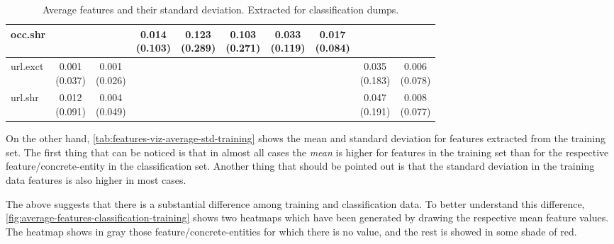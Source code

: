 \documentclass[epsfig,a4paper,11pt,titlepage,twoside,openany]{book}
\begin{document}
\begin{table}[H]
\begin{tabular}{l|c|c|c|c|c|c|c|c|c|}
\multicolumn{1}{|l|}{occ.shr}                  &               &              & \makecell{0.014 \\ (0.103)} & \makecell{0.123 \\ (0.289)} & \makecell{0.103 \\ (0.271)} & \makecell{0.033 \\ (0.119)} & \makecell{0.017 \\ (0.084)} &                 &                \\ \hline
\multicolumn{1}{|l|}{url.exct}                           & \makecell{0.001 \\ (0.037)}  & \makecell{0.001 \\ (0.026)} &              &              &              &              &              & \makecell{0.035 \\ (0.183)}    & \makecell{0.006 \\ (0.078)}   \\ \hline
\multicolumn{1}{|l|}{url.shr}                  & \makecell{0.012 \\ (0.091)}  & \makecell{0.004 \\ (0.049)} &              &              &              &              &              & \makecell{0.047 \\ (0.191)}    & \makecell{0.008 \\ (0.077)}   \\ \hline
\end{tabular}
\caption{Average features and their standard deviation. Extracted for classification dumps.}
\label{tab:features-viz-average-std-classification}
\end{table}


On the other hand, \autoref{tab:features-viz-average-std-training} shows the mean and standard deviation for features extracted from the training set. The first thing that can be noticed is that in almost all cases the \textit{mean} is higher for features in the training set than for the respective feature/concrete-entity in the classification set. Another thing that should be pointed out is that the standard deviation in the training data features is also higher in most cases. 


The above suggests that there is a substantial difference among training and classification data. To better understand this difference, \autoref{fig:average-features-classification-training} shows two heatmaps which have been generated by drawing the respective mean feature values. The heatmap shows in gray those feature/concrete-entities for which there is no value, and the rest is showed in some shade of red. 
\end{document}

